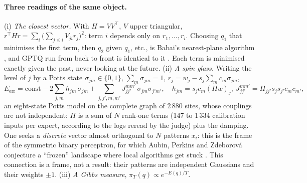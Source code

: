 \paragraph{Three readings of the same object.} (i) \emph{The closest vector.} With $H = VV^\top$, $V$ upper triangular, $r^\top H r = \sum_i \bigl(\sum_{j \le i} V_{ji} r_j\bigr)^2$: term $i$ depends only on $r_1, \dots, r_i$. Choosing $q_1$ that minimises the first term, then $q_2$ given $q_1$, etc., is Babai's nearest-plane algorithm \cite{babai1986}, and GPTQ run from back to front is identical to it \cite{chen2025babai,frantar2022gptq}. Each term is minimised exactly given the past, never looking at the future. (ii) \emph{A spin glass.} Writing the level of $j$ by a Potts state $\sigma_{jm} \in \{0,1\}$, $\sum_m \sigma_{jm} = 1$, $r_j = w_j - s_j \sum_m c_m \sigma_{jm}$,
\begin{equation}\label{t3mim:eq:potts}
E_{\text{err}} = \text{const} - 2\sum_{j,m} h_{jm}\,\sigma_{jm} + \sum_{j,j',m,m'} J^{mm'}_{jj'}\,\sigma_{jm}\sigma_{j'm'}, \quad h_{jm} = s_j c_m (Hw)_j,\ J^{mm'}_{jj'} = H_{jj'} s_j s_{j'} c_m c_{m'} ,
\end{equation}
an eight-state Potts model on the complete graph of 2\,880 sites, whose couplings are not independent: $H$ is a sum of $N$ rank-one terms (147 to 1\,334 calibration inputs per expert, according to the logs reread by the judge) plus the damping. One seeks a \emph{discrete} vector almost orthogonal to $N$ patterns $x_i$: this is the frame of the symmetric binary perceptron, for which Aubin, Perkins and Zdeborová conjecture a ``frozen'' landscape where local algorithms get stuck \cite{aubin2019perceptrons}. This connection is a frame, not a result: their patterns are independent Gaussians and their weights $\pm 1$. (iii) \emph{A Gibbs measure}, $\pi_T(q) \propto e^{-E(q)/T}$.

